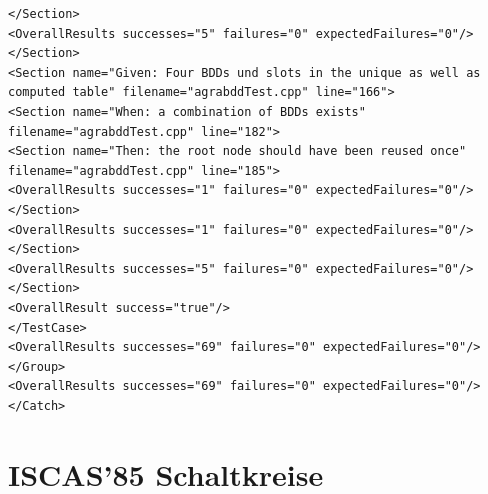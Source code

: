\begin{verbatim}
</Section>
<OverallResults successes="5" failures="0" expectedFailures="0"/>
</Section>
<Section name="Given: Four BDDs und slots in the unique as well as computed table" filename="agrabddTest.cpp" line="166">
<Section name="When: a combination of BDDs exists" filename="agrabddTest.cpp" line="182">
<Section name="Then: the root node should have been reused once" filename="agrabddTest.cpp" line="185">
<OverallResults successes="1" failures="0" expectedFailures="0"/>
</Section>
<OverallResults successes="1" failures="0" expectedFailures="0"/>
</Section>
<OverallResults successes="5" failures="0" expectedFailures="0"/>
</Section>
<OverallResult success="true"/>
</TestCase>
<OverallResults successes="69" failures="0" expectedFailures="0"/>
</Group>
<OverallResults successes="69" failures="0" expectedFailures="0"/>
</Catch>
\end{verbatim}
\normalsize
\newpage
\section*{ISCAS'85 Schaltkreise}
\label{sec:iscas85}
